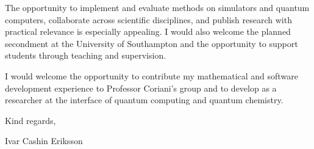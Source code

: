 \documentclass[11pt,a4paper]{moderncv}
\begin{document}
\hspace*{2em}
The opportunity to implement and evaluate methods on simulators and quantum computers, collaborate across scientific disciplines, and publish research with practical relevance is especially appealing. I would also welcome the planned secondment at the University of Southampton and the opportunity to support students through teaching and supervision.

\hspace*{2em}
I would welcome the opportunity to contribute my mathematical and software development experience to Professor Coriani's group and to develop as a researcher at the interface of quantum computing and quantum chemistry.

\vspace{2em}
Kind regards, 

Ivar Cashin Eriksson
\end{document}

